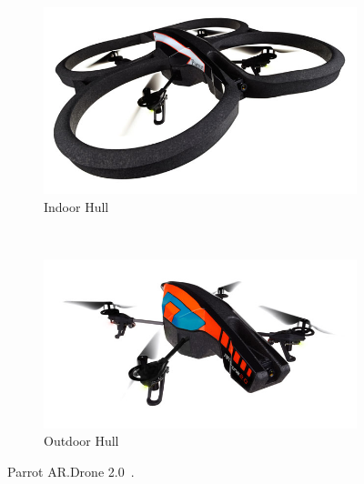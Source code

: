     \begin{figure}[ht]
            \centering
            \begin{subfigure}[b]{0.5\textwidth}
                    \centering
                    \includegraphics[width=\textwidth]{../images/ardrone_indoor.jpg}
                    \caption{Indoor Hull}
                    \label{fig:indoor}
            \end{subfigure}%
            ~ %
            \begin{subfigure}[b]{0.5\textwidth}
                    \centering
                    \includegraphics[width=\textwidth]{../images/ardrone_outdoor.jpg}
                    \caption{Outdoor Hull}
                    \label{fig:outdoor}
            \end{subfigure}
            \caption{Parrot AR.Drone 2.0~\cite{ParrotPress}.}\label{fig:ardrone}
    \end{figure}

